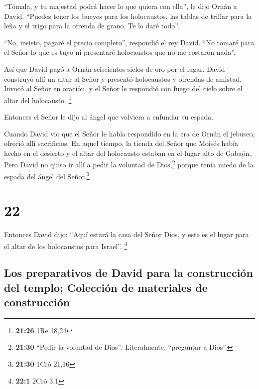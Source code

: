  ``Tómala, y tu majestad podrá hacer lo que quiera con
ella'', le dijo Ornán a David. ``Puedes tener los bueyes para los
holocaustos, las tablas de trillar para la leña y el trigo para la
ofrenda de grano. Te lo daré todo''.

 ``No, insisto, pagaré el precio completo'', respondió el
rey David. ``No tomaré para el Señor lo que es tuyo ni presentaré
holocaustos que no me costaron nada''.

 Así que David pagó a Ornán seiscientos siclos de oro por
el lugar.  David construyó allí un altar al Señor y
presentó holocaustos y ofrendas de amistad. Invocó al Señor en oración,
y el Señor le respondió con fuego del cielo sobre el altar del
holocausto. \footnote{\textbf{21:26} 1Re 18,24}

 Entonces el Señor le dijo al ángel que volviera a
enfundar su espada.

 Cuando David vio que el Señor le había respondido en la
era de Ornán el jebuseo, ofreció allí sacrificios.  En
aquel tiempo, la tienda del Señor que Moisés había hecho en el desierto
y el altar del holocausto estaban en el lugar alto de Gabaón.
 Pero David no quiso ir allí a pedir la voluntad de
Dios,\footnote{\textbf{21:30} ``Pedir la voluntad de Dios'':
  Literalmente, ``preguntar a Dios''.} porque tenía miedo de la espada
del ángel del Señor.\footnote{\textbf{21:30} 1Cró 21,16}

\hypertarget{section-21}{%
\section{22}\label{section-21}}

 Entonces David dijo: ``Aquí estará la casa del Señor
Dios, y este es el lugar para el altar de los holocaustos para Israel''.
\footnote{\textbf{22:1} 2Cró 3,1}

\hypertarget{los-preparativos-de-david-para-la-construcciuxf3n-del-templo-colecciuxf3n-de-materiales-de-construcciuxf3n}{%
\subsection{Los preparativos de David para la construcción del templo;
Colección de materiales de
construcción}\label{los-preparativos-de-david-para-la-construcciuxf3n-del-templo-colecciuxf3n-de-materiales-de-construcciuxf3n}}

